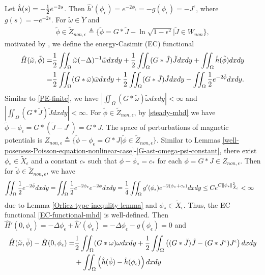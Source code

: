\documentclass[1 [leqno, 11pt]{amsart}
\numberwithin{equation}{section}
\let\ep=\epsilon
\begin{document}
\begin{CJK*}{GBK}{song}
Let $\hat h(s)=-{1\over2}e^{-2s}$. Then $\hat h'(\phi_\ep)=e^{-2\phi_\ep}=-g( \phi_\ep)=-J^{\ep}$, where $g(s)=-e^{-2s}$. For $\tilde \omega\in\tilde Y$ and
\begin{align}\label{def-Z-non-ep}
\tilde \phi\in \tilde Z_{non,\ep}\triangleq \{ \tilde \phi=G*\tilde J-\ln\sqrt{1-\epsilon^2}|\tilde J\in W_{non}\},
\end{align}
motivated by \cite{holm1985nonlinear}, we define the energy-Casimir (EC) functional
\begin{align}\nonumber
\hat H(\tilde \omega,\tilde \phi)=&{1\over2}\iint_{\Omega}\tilde\omega(-\Delta)^{-1}\tilde\omega dxdy+{1\over2}\iint_{\Omega}(G\ast\tilde J)\tilde J  dxdy+\iint_{\Omega}\hat h(\tilde\phi) dxdy\\\label{EC-functional-mhd}
=&{1\over2}\iint_{\Omega}(G\ast\tilde\omega)\tilde\omega dxdy+{1\over2}\iint_{\Omega}(G\ast \tilde J) \tilde J dxdy-\iint_{\Omega}{1\over2}e^{-2\tilde\phi} dxdy.
\end{align}
Similar to \eqref{PE-finite}, we have $|\iint_{\Omega}(G\ast\tilde\omega)\tilde\omega dxdy|<\infty$ and $|\iint_{\Omega}(G\ast\tilde J)\tilde J  dxdy|<\infty$.
For $\tilde \phi\in \tilde Z_{non,\ep}$, by \eqref{steady-mhd} we have $\tilde \phi-\phi_\ep=G*(\tilde J-J^{\ep})=G*J$.
 The space of perturbations of  magnetic potentials is
$ Z_{non,\ep}\triangleq\{\tilde \phi-\phi_\ep=G*J|\tilde \phi\in \tilde Z_{non,\ep}\}$. Similar to Lemmas \ref{well-poseness-Poisson-equation-nonlinear-case}-\ref{G-ast-omega-psi-constant},
there exist $\phi_*\in \tilde X_\ep$ and a constant $c_*$  such that $\phi-\phi_*=c_*$ for each $\phi=G*J\in Z_{non,\ep}$. Then for $\tilde \phi\in \tilde Z_{non,\ep}$, we have
 \begin{align*}
\iint_{\Omega}{1\over2}e^{-2\tilde\phi} dxdy=&\iint_{\Omega}{1\over2}e^{-2\phi_\ep}e^{-2\phi} dxdy={1\over4}\iint_{\Omega}g'( \phi_\ep)e^{-2(\phi_*+c_*)} dxdy
\leq C e^{C\|\phi_*\|_{\tilde{X}_\ep}^2}<\infty
\end{align*}
due to Lemma \ref{Orlicz-type inequlity-lemma} and $\phi_*\in \tilde X_\ep$. Thus, the EC functional \eqref{EC-functional-mhd} is well-defined. Then $\hat H'(0,\phi_{\ep})=-\Delta\phi_{\ep}+\hat h'(\phi_{\ep})=-\Delta\phi_{\ep}-g(\phi_{\ep})=0$ and
\begin{align}\nonumber
\hat H(\tilde \omega,\tilde \phi)-\hat H( 0,  \phi_{\ep})
=&{1\over2}\iint_{\Omega}(G\ast\omega)\omega dxdy+{1\over2}\iint_{\Omega}\left((G\ast\tilde J)\tilde J-(G\ast J^{\ep}) J^{\ep}\right)dxdy\\\nonumber
&+\iint_{\Omega}\left(\hat h(\tilde\phi)-\hat h(\phi_{\ep}) \right)dxdy\\\nonumber

\end{align}
\end{CJK*}
\end{document}
